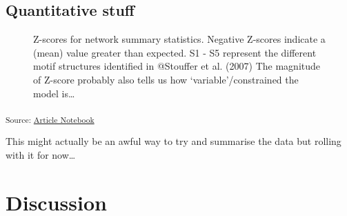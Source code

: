 \documentclass[
  letterpaper,
  DIV=11,
  numbers=noendperiod]{scrartcl}
\begin{document}
\subsection{Quantitative stuff}\label{quantitative-stuff}

\begin{figure}[H]


\caption{\label{fig-topology}Z-scores for network summary statistics.
Negative Z-scores indicate a (mean) value greater than expected. S1 - S5
represent the different motif structures identified in @Stouffer et al.
(2007) The magnitude of Z-score probably also tells us how
`variable'/constrained the model is\ldots{}}

\end{figure}%

\textsubscript{Source:
\href{https://BecksLab.github.io/ms_t_is_for_topology/index.qmd.html}{Article
Notebook}}

This might actually be an awful way to try and summarise the data but
rolling with it for now\ldots{}

\section{Discussion}\label{discussion}
\end{document}
